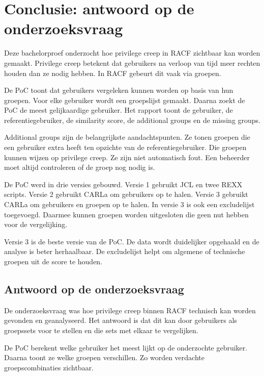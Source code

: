 
\chapter[Conclusie]{Conclusie: antwoord op de onderzoeksvraag}%
\label{ch:conclusie}

Deze bachelorproef onderzocht hoe privilege creep in RACF zichtbaar kan worden gemaakt. Privilege creep betekent dat gebruikers na verloop van tijd meer rechten houden dan ze nodig hebben. In RACF gebeurt dit vaak via groepen.

De PoC toont dat gebruikers vergeleken kunnen worden op basis van hun groepen. Voor elke gebruiker wordt een groepslijst gemaakt. Daarna zoekt de PoC de meest gelijkaardige gebruiker. Het rapport toont de gebruiker, de referentiegebruiker, de similarity score, de additional groups en de missing groups.

Additional groups zijn de belangrijkste aandachtspunten. Ze tonen groepen die een gebruiker extra heeft ten opzichte van de referentiegebruiker. Die groepen kunnen wijzen op privilege creep. Ze zijn niet automatisch fout. Een beheerder moet altijd controleren of de groep nog nodig is.

De PoC werd in drie versies gebouwd. Versie 1 gebruikt JCL en twee REXX scripts. Versie 2 gebruikt CARLa om gebruikers op te halen. Versie 3 gebruikt CARLa om gebruikers en groepen op te halen. In versie 3 is ook een excludelijst toegevoegd. Daarmee kunnen groepen worden uitgesloten die geen nut hebben voor de vergelijking.

Versie 3 is de beste versie van de PoC. De data wordt duidelijker opgehaald en de analyse is beter herhaalbaar. De excludelijst helpt om algemene of technische groepen uit de score te houden.

\section{Antwoord op de onderzoeksvraag}

De onderzoeksvraag was hoe privilege creep binnen RACF technisch kan worden gevonden en geanalyseerd. Het antwoord is dat dit kan door gebruikers als groepssets voor te stellen en die sets met elkaar te vergelijken.

De PoC berekent welke gebruiker het meest lijkt op de onderzochte gebruiker. Daarna toont ze welke groepen verschillen. Zo worden verdachte groepscombinaties zichtbaar.

